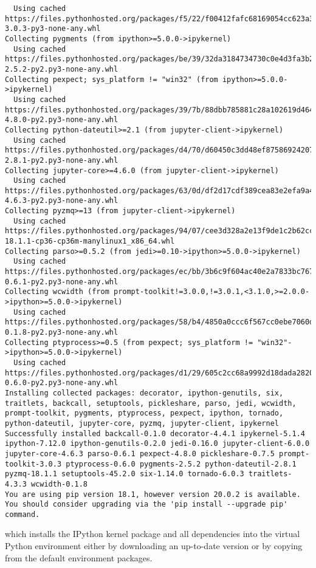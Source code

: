 \documentclass[11pt,a4paper]{article}
\begin{document}
\begin{verbatim}
  Using cached https://files.pythonhosted.org/packages/f5/22/f00412fafc68169054cc623a35c32773f22b403ddbe516c8adfdecf25341/prompt_toolkit-3.0.3-py3-none-any.whl
Collecting pygments (from ipython>=5.0.0->ipykernel)
  Using cached https://files.pythonhosted.org/packages/be/39/32da3184734730c0e4d3fa3b2b5872104668ad6dc1b5a73d8e477e5fe967/Pygments-2.5.2-py2.py3-none-any.whl
Collecting pexpect; sys_platform != "win32" (from ipython>=5.0.0->ipykernel)
  Using cached https://files.pythonhosted.org/packages/39/7b/88dbb785881c28a102619d46423cb853b46dbccc70d3ac362d99773a78ce/pexpect-4.8.0-py2.py3-none-any.whl
Collecting python-dateutil>=2.1 (from jupyter-client->ipykernel)
  Using cached https://files.pythonhosted.org/packages/d4/70/d60450c3dd48ef87586924207ae8907090de0b306af2bce5d134d78615cb/python_dateutil-2.8.1-py2.py3-none-any.whl
Collecting jupyter-core>=4.6.0 (from jupyter-client->ipykernel)
  Using cached https://files.pythonhosted.org/packages/63/0d/df2d17cdf389cea83e2efa9a4d32f7d527ba78667e0153a8e676e957b2f7/jupyter_core-4.6.3-py2.py3-none-any.whl
Collecting pyzmq>=13 (from jupyter-client->ipykernel)
  Using cached https://files.pythonhosted.org/packages/94/07/cee3d328a2e13f9de1c2b62cced7a389b61ac81424f2e377f3dc9d668282/pyzmq-18.1.1-cp36-cp36m-manylinux1_x86_64.whl
Collecting parso>=0.5.2 (from jedi>=0.10->ipython>=5.0.0->ipykernel)
  Using cached https://files.pythonhosted.org/packages/ec/bb/3b6c9f604ac40e2a7833bc767bd084035f12febcbd2b62204c5bc30edf97/parso-0.6.1-py2.py3-none-any.whl
Collecting wcwidth (from prompt-toolkit!=3.0.0,!=3.0.1,<3.1.0,>=2.0.0->ipython>=5.0.0->ipykernel)
  Using cached https://files.pythonhosted.org/packages/58/b4/4850a0ccc6f567cc0ebe7060d20ffd4258b8210efadc259da62dc6ed9c65/wcwidth-0.1.8-py2.py3-none-any.whl
Collecting ptyprocess>=0.5 (from pexpect; sys_platform != "win32"->ipython>=5.0.0->ipykernel)
  Using cached https://files.pythonhosted.org/packages/d1/29/605c2cc68a9992d18dada28206eeada56ea4bd07a239669da41674648b6f/ptyprocess-0.6.0-py2.py3-none-any.whl
Installing collected packages: decorator, ipython-genutils, six, traitlets, backcall, setuptools, pickleshare, parso, jedi, wcwidth, prompt-toolkit, pygments, ptyprocess, pexpect, ipython, tornado, python-dateutil, jupyter-core, pyzmq, jupyter-client, ipykernel
Successfully installed backcall-0.1.0 decorator-4.4.1 ipykernel-5.1.4 ipython-7.12.0 ipython-genutils-0.2.0 jedi-0.16.0 jupyter-client-6.0.0 jupyter-core-4.6.3 parso-0.6.1 pexpect-4.8.0 pickleshare-0.7.5 prompt-toolkit-3.0.3 ptyprocess-0.6.0 pygments-2.5.2 python-dateutil-2.8.1 pyzmq-18.1.1 setuptools-45.2.0 six-1.14.0 tornado-6.0.3 traitlets-4.3.3 wcwidth-0.1.8
You are using pip version 18.1, however version 20.0.2 is available.
You should consider upgrading via the 'pip install --upgrade pip' command.
\end{verbatim}
%
which installs the IPython kernel package and all dependencies into the virtual Python environment either by downloading an up-to-date version or by copying from the default environment packages.
\end{document}
